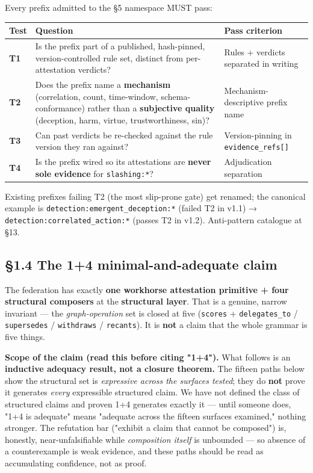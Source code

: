 \documentclass[11pt]{article}
\begin{document}
Every prefix admitted to the §5 namespace MUST pass:


{\footnotesize
\begin{longtable}{|p{5.33cm}|p{5.33cm}|p{5.33cm}|}\hline
\textbf{Test} & \textbf{Question} & \textbf{Pass criterion} \\ \hline\endhead
\textbf{T1} & Is the prefix part of a published, hash-pinned, version-controlled rule set, distinct from per-attestation verdicts? & Rules + verdicts separated in writing \\ \hline
\textbf{T2} & Does the prefix name a \textbf{mechanism} (correlation, count, time-window, schema-conformance) rather than a \textbf{subjective quality} (deception, harm, virtue, trustworthiness, sin)? & Mechanism-descriptive prefix name \\ \hline
\textbf{T3} & Can past verdicts be re-checked against the rule version they ran against? & Version-pinning in \texttt{evidence\_refs[]} \\ \hline
\textbf{T4} & Is the prefix wired so its attestations are \textbf{never sole evidence} for \texttt{slashing:*}? & Adjudication separation \\ \hline
\end{longtable}}


Existing prefixes failing T2 (the most slip-prone gate) get renamed; the canonical example is \texttt{detection:emergent\_deception:*} (failed T2 in v1.1) → \texttt{detection:correlated\_action:*} (passes T2 in v1.2). Anti-pattern catalogue at §13.


\subsection*{§1.4 The 1+4 minimal-and-adequate claim}


The federation has exactly \textbf{one workhorse attestation primitive + four structural composers} at the \textbf{structural layer}. That is a genuine, narrow invariant — the \textit{graph-operation} set is closed at five (\texttt{scores} + \texttt{delegates\_to} / \texttt{supersedes} / \texttt{withdraws} / \texttt{recants}). It is \textbf{not} a claim that the whole grammar is five things.


\textbf{Scope of the claim (read this before citing "1+4").} What follows is an \textbf{inductive adequacy result, not a closure theorem.} The fifteen paths below show the structural set is \textit{expressive across the surfaces tested}; they do \textbf{not} prove it generates \textit{every} expressible structured claim. We have not defined the class of structured claims and proven 1+4 generates exactly it — until someone does, "1+4 is adequate" means "adequate across the fifteen surfaces examined," nothing stronger. The refutation bar ("exhibit a claim that cannot be composed") is, honestly, near-unfalsifiable while \textit{composition itself} is unbounded — so absence of a counterexample is weak evidence, and these paths should be read as accumulating confidence, not as proof.
\end{document}
